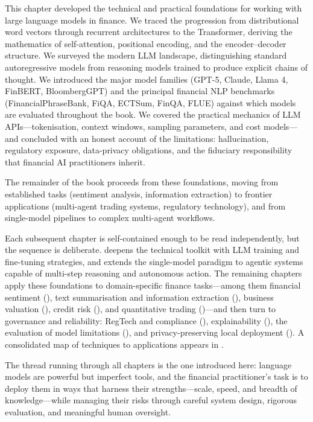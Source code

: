 This chapter developed the technical and practical foundations for working with large
language models in finance.  We traced the progression from distributional word
vectors through recurrent architectures to the Transformer, deriving the mathematics
of self-attention, positional encoding, and the encoder--decoder structure.
We surveyed the modern LLM landscape, distinguishing standard autoregressive models
from reasoning models trained to produce explicit chains of thought.  We introduced
the major model families (GPT-5, Claude, Llama 4, FinBERT, BloombergGPT) and the
principal financial NLP benchmarks (FinancialPhraseBank, FiQA, ECTSum, FinQA, FLUE)
against which models are evaluated throughout the book.  We covered the practical
mechanics of LLM APIs---tokenisation, context windows, sampling parameters, and cost
models---and concluded with an honest account of the limitations: hallucination,
regulatory exposure, data-privacy obligations, and the fiduciary responsibility that
financial AI practitioners inherit.

The remainder of the book proceeds from these foundations, moving from established
tasks (sentiment analysis, information extraction) to frontier applications (multi-agent
trading systems, regulatory technology), and from single-model pipelines to complex
multi-agent workflows.

Each subsequent chapter is self-contained enough to be read independently, but the
sequence is deliberate.   deepens the technical toolkit with LLM
training and fine-tuning strategies, and  extends the single-model
paradigm to agentic systems capable of multi-step reasoning and autonomous action. The
remaining chapters apply these foundations to domain-specific finance tasks---among them
financial sentiment (), text summarisation and
information extraction (), business valuation
(), credit risk (), and quantitative
trading ()---and then turn to governance and reliability:
RegTech and compliance (), explainability
(), the evaluation of model limitations
(), and privacy-preserving local deployment
(). A consolidated map of techniques to applications appears
in .

The thread running through all chapters is the one introduced here: language models
are powerful but imperfect tools, and the financial practitioner's task is to deploy
them in ways that harness their strengths---scale, speed, and breadth of
knowledge---while managing their risks through careful system design, rigorous
evaluation, and meaningful human oversight.



